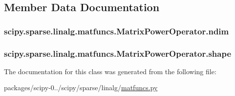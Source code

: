 \subsection{Member Data Documentation}
\hypertarget{classscipy_1_1sparse_1_1linalg_1_1matfuncs_1_1MatrixPowerOperator_aed218003c5a29ebf80da236db4622c88}{}
\subsubsection[{ndim}]{\setlength{\rightskip}{0pt plus 5cm}scipy.\+sparse.\+linalg.\+matfuncs.\+Matrix\+Power\+Operator.\+ndim}\label{classscipy_1_1sparse_1_1linalg_1_1matfuncs_1_1MatrixPowerOperator_aed218003c5a29ebf80da236db4622c88}
\hypertarget{classscipy_1_1sparse_1_1linalg_1_1matfuncs_1_1MatrixPowerOperator_ac2db298db480c5751ba59d99c232beeb}{}
\subsubsection[{shape}]{\setlength{\rightskip}{0pt plus 5cm}scipy.\+sparse.\+linalg.\+matfuncs.\+Matrix\+Power\+Operator.\+shape}\label{classscipy_1_1sparse_1_1linalg_1_1matfuncs_1_1MatrixPowerOperator_ac2db298db480c5751ba59d99c232beeb}


The documentation for this class was generated from the following file\+:\begin{DoxyCompactItemize}
\item 
packages/scipy-\/0../scipy/sparse/linalg/\hyperlink{sparse_2linalg_2matfuncs_8py}{matfuncs.\+py}\end{DoxyCompactItemize}
